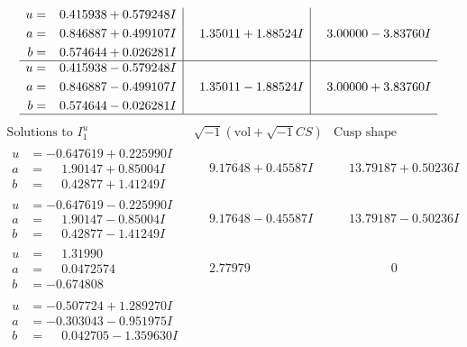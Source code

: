 \documentclass[1p]{elsarticle_modified}
\theoremstyle{definition}
\newcommand{\I}{\sqrt{-1}}
\begin{document}
$$\begin{array}{c|c|c}
\begin{aligned}
u &= \phantom{-}0.415938 + 0.579248 I \\
a &= \phantom{-}0.846887 + 0.499107 I \\
b &= \phantom{-}0.574644 + 0.026281 I\end{aligned}
 & \phantom{-}1.35011 + 1.88524 I & \phantom{-}3.00000 - 3.83760 I \\ \hline\begin{aligned}
u &= \phantom{-}0.415938 - 0.579248 I \\
a &= \phantom{-}0.846887 - 0.499107 I \\
b &= \phantom{-}0.574644 - 0.026281 I\end{aligned}
 & \phantom{-}1.35011 - 1.88524 I & \phantom{-}3.00000 + 3.83760 I\\
 \hline 
 \end{array}$$\newpage$$\begin{array}{c|c|c}  
\text{Solutions to }I^u_{1}& \I (\text{vol} + \sqrt{-1}CS) & \text{Cusp shape}\\
 \hline 
\begin{aligned}
u &= -0.647619 + 0.225990 I \\
a &= \phantom{-}1.90147 + 0.85004 I \\
b &= \phantom{-}0.42877 + 1.41249 I\end{aligned}
 & \phantom{-}9.17648 + 0.45587 I & \phantom{-}13.79187 + 0.50236 I \\ \hline\begin{aligned}
u &= -0.647619 - 0.225990 I \\
a &= \phantom{-}1.90147 - 0.85004 I \\
b &= \phantom{-}0.42877 - 1.41249 I\end{aligned}
 & \phantom{-}9.17648 - 0.45587 I & \phantom{-}13.79187 - 0.50236 I \\ \hline\begin{aligned}
u &= \phantom{-}1.31990\phantom{ +0.000000I} \\
a &= \phantom{-}0.0472574\phantom{ +0.000000I} \\
b &= -0.674808\phantom{ +0.000000I}\end{aligned}
 & \phantom{-}2.77979\phantom{ +0.000000I} & \phantom{-0.000000 } 0 \\ \hline\begin{aligned}
u &= -0.507724 + 1.289270 I \\
a &= -0.303043 - 0.951975 I \\
b &= \phantom{-}0.042705 - 1.359630 I\end{aligned}

\end{array}$$
\end{document}
